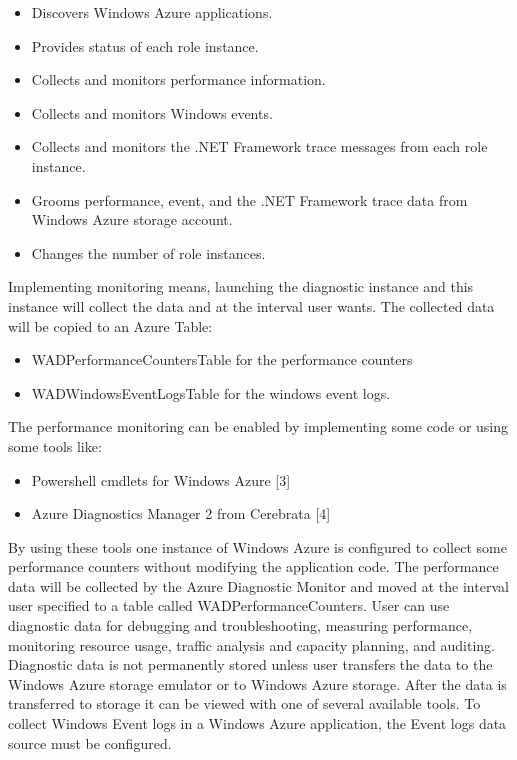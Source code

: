 \documentclass{sig-alternate}
\begin{document}
\begin{itemize}
 \item Discovers Windows Azure applications.
 \item Provides status of each role instance.
 \item Collects and monitors performance information.
 \item Collects and monitors Windows events.
 \item Collects and monitors the .NET Framework trace messages from each role instance.
 \item Grooms performance, event, and the .NET Framework trace data from Windows Azure storage account.
 \item Changes the number of role instances.
\end{itemize}

Implementing monitoring means, launching the diagnostic instance and this instance will collect the data and at the interval user wants. The collected data will be copied to an Azure Table:

\begin{itemize}
\item WADPerformanceCountersTable for the performance counters
\item WADWindowsEventLogsTable for the windows event logs.
\end{itemize}

The performance monitoring can be enabled by implementing some code or using some tools like:

\begin{itemize}
\item Powershell cmdlets for Windows Azure [3]
\item Azure Diagnostics Manager 2 from Cerebrata [4]
\end{itemize}

By using these tools one instance of Windows Azure is configured to collect some performance counters without modifying the application code. The performance data will be collected by the Azure Diagnostic Monitor and moved at the interval user specified to a table called WADPerformanceCounters. User can use diagnostic data for debugging and troubleshooting, measuring performance, monitoring resource usage, traffic analysis and capacity planning, and auditing. Diagnostic data is not permanently stored unless user transfers the data to the Windows Azure storage emulator or to Windows Azure storage. After the data is transferred to storage it can be viewed with one of several available tools. To collect Windows Event logs in a Windows Azure application, the Event logs data source must be configured.
\end{document}
